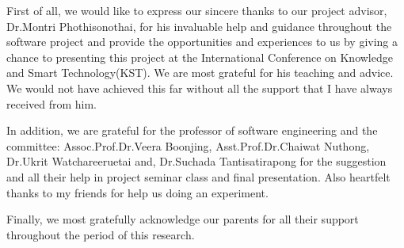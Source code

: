 \cleardoublepage


\begin{acknowledgements}

\hspace{1.5cm}First of all, we  would like to express our sincere thanks to our project advisor, Dr.Montri Phothisonothai, for his invaluable help and guidance throughout the software project and  provide the opportunities and experiences to us by giving a chance to presenting this project at the International Conference on Knowledge and Smart Technology(KST). We are most grateful for his teaching and advice. We would not have achieved this far without all the support that I have always received from him.

\hspace{1.5cm}In addition, we are grateful for the professor of software engineering and the committee: 
Assoc.Prof.Dr.Veera Boonjing, 
Asst.Prof.Dr.Chaiwat Nuthong, 
Dr.Ukrit Watchareeruetai and,  
Dr.Suchada Tantisatirapong
for the suggestion and all their help in project seminar class and final presentation. 
Also heartfelt thanks to my friends for help us doing an experiment.

\hspace{1.5cm}Finally, we most gratefully acknowledge our parents for all their support throughout the period of this research.

\end{acknowledgements}